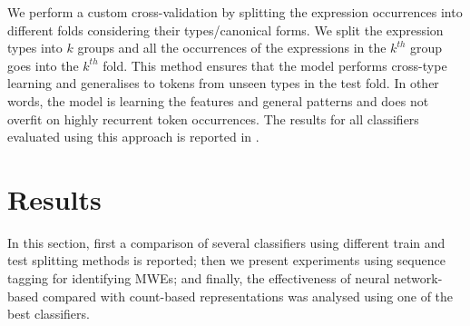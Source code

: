 \documentclass[output=paper,modfonts,nonflat]{langsci/langscibook}
\begin{document}
We perform a custom cross-validation by splitting the expression occurrences into different folds considering their types/canonical forms. We split the expression types into $k$ groups and all the occurrences of the expressions in the $k^{th}$ group goes into the $k^{th}$ fold. 
This method ensures that the model performs cross-type learning and generalises to tokens from unseen types in the test fold. In other words, the model is learning the features and general patterns and does not overfit on highly recurrent token occurrences.
The results for all classifiers evaluated using this approach is reported in .


\section{Results}

In this section, first a comparison of several classifiers using different train and test splitting methods is reported; then we present experiments using sequence tagging for identifying MWEs; and finally, the effectiveness of neural network-based  compared with count-based representations was analysed using one of the best classifiers.
\end{document}
